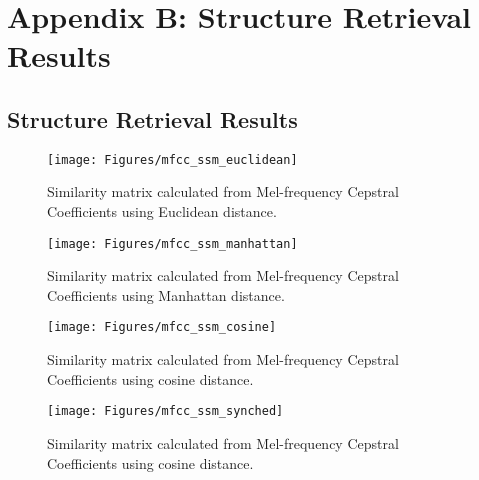 
\chapter{Appendix B: Structure Retrieval Results} %

\label{AppendixB} %



\section{Structure Retrieval Results}
\label{sec:mfccappen}

\begin{figure}[b]
    \texttt{[image: Figures/mfcc\_ssm\_euclidean]}
    \centering

  \caption{Similarity matrix calculated from Mel-frequency Cepstral Coefficients using Euclidean distance.}
  \label{fig:mfcceuclid}
\end{figure}


\begin{figure}[t]
    \texttt{[image: Figures/mfcc\_ssm\_manhattan]}
    \centering

  \caption{Similarity matrix calculated from Mel-frequency Cepstral Coefficients using Manhattan distance.}
  \label{fig:mfccmanhattan}
\end{figure}


\begin{figure}[b]
    \texttt{[image: Figures/mfcc\_ssm\_cosine]}
    \centering

  \caption{Similarity matrix calculated from Mel-frequency Cepstral Coefficients using cosine distance.}
  \label{fig:mfcccosine}
\end{figure}


\begin{figure}[b]
    \texttt{[image: Figures/mfcc\_ssm\_synched]}
    \centering

  \caption{Similarity matrix calculated from Mel-frequency Cepstral Coefficients using cosine distance.}
  \label{fig:mfcccorrelation}
\end{figure}